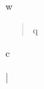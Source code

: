 \documentclass[11pt]{article}
\author{Au}
\date{2026-01-01}
\title{}
\begin{document}
\tableofcontents

\begin{Warning}
w
\end{Warning}

\begin{LATEX}
\foo
\end{LATEX}

\begin{quote}
q
\end{quote}

\begin{center}
c
\end{center}

\bar
\end{document}
